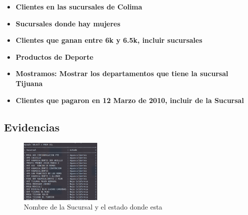 \documentclass[12pt, fleqn]{article}                             %
\begin{document}
\begin{itemize}
        \item
            \textbf{Clientes en las sucursales de Colima}
            

        \item
            \textbf{Sucursales donde hay mujeres}
            

        \clearpage

        \item
            \textbf{Clientes que ganan entre 6k y 6.5k, incluir sucursales}
            

        \item
            \textbf{Productos de Deporte}
            

        \item
            \textbf{Mostramos: Mostrar los departamentos que tiene la sucursal Tijuana}
            

        \item
            \textbf{Clientes que pagaron en 12 Marzo de 2010, incluir de la Sucursal}
            

    \end{itemize}


    \clearpage
    \subsection{Evidencias}

        \begin{figure}[ht!]
            \centering
            \includegraphics[width=0.35\textwidth]{BD5Reporte1}
            \caption{Nombre de la Sucursal y el estado donde esta}
        \end{figure}
\end{document}
